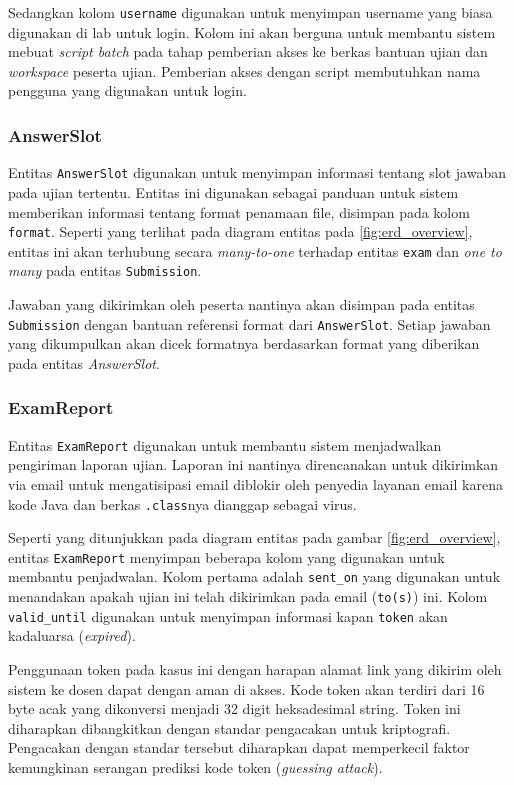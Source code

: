     Sedangkan kolom \texttt{username} digunakan untuk menyimpan username yang biasa digunakan
    di lab untuk login. Kolom ini akan berguna untuk membantu sistem mebuat \textit{script batch}
    pada tahap pemberian akses ke berkas bantuan ujian dan \textit{workspace} peserta ujian. 
    Pemberian akses dengan script membutuhkan nama pengguna yang digunakan untuk login.
    
\subsubsection{AnswerSlot}
    Entitas \texttt{AnswerSlot} digunakan untuk menyimpan informasi tentang slot jawaban 
    pada ujian tertentu. Entitas ini digunakan sebagai panduan untuk sistem memberikan
    informasi tentang format penamaan file, disimpan pada kolom \texttt{format}. 
    Seperti yang terlihat pada
    diagram entitas pada \ref{fig:erd_overview}, entitas ini akan terhubung secara 
    \textit{many-to-one} terhadap entitas \texttt{exam} dan \textit{one to many} pada entitas
    \texttt{Submission}.
    
    Jawaban yang dikirimkan oleh peserta nantinya akan disimpan pada entitas \texttt{Submission}
    dengan bantuan referensi format dari \texttt{AnswerSlot}. Setiap jawaban yang dikumpulkan akan dicek
    formatnya berdasarkan format yang diberikan pada entitas \textit{AnswerSlot}.

\subsubsection{ExamReport}
    Entitas \texttt{ExamReport} digunakan untuk membantu sistem menjadwalkan pengiriman laporan
    ujian. Laporan ini nantinya direncanakan untuk dikirimkan via email untuk mengatisipasi email
    diblokir oleh penyedia layanan email karena kode Java dan berkas \texttt{.class}nya dianggap 
    sebagai virus.
    
    Seperti yang ditunjukkan pada diagram entitas pada gambar \ref{fig:erd_overview}, entitas 
    \texttt{ExamReport} menyimpan beberapa kolom yang digunakan untuk membantu penjadwalan.
    Kolom pertama adalah \texttt{sent\_on} yang digunakan untuk menandakan apakah ujian ini
    telah dikirimkan pada email (\texttt{to(s)}) ini. Kolom \texttt{valid\_until} digunakan
    untuk menyimpan informasi kapan \texttt{token} akan kadaluarsa (\textit{expired}).
    
    Penggunaan token pada kasus ini dengan harapan alamat link yang dikirim oleh sistem
    ke dosen dapat dengan aman di akses. Kode token akan terdiri dari 16 byte acak yang
    dikonversi menjadi 32 digit heksadesimal string. Token ini diharapkan 
    dibangkitkan dengan standar pengacakan untuk kriptografi.  Pengacakan dengan standar 
    tersebut diharapkan dapat memperkecil faktor kemungkinan serangan prediksi 
    kode token (\textit{guessing attack}).

